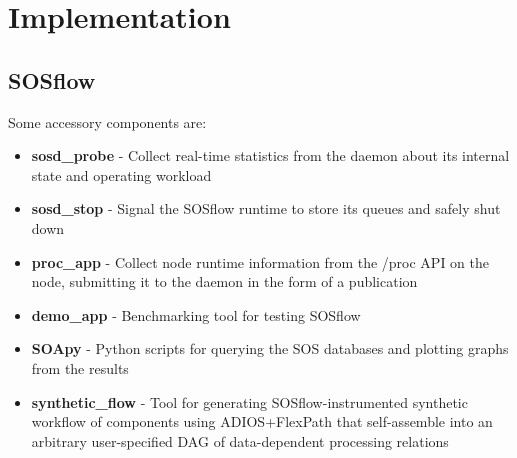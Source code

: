 %
%


%




\section{Implementation}


\subsection{SOSflow}


Some accessory components are:
%
\begin{itemize}
    \item \textbf{sosd\_probe} - Collect real-time statistics from the daemon about
      its internal state and operating workload
    \item \textbf{sosd\_stop} - Signal the SOSflow runtime to store its queues and
      safely shut down
    \item \textbf{proc\_app} - Collect node runtime information from
      the /proc API on the node, submitting it to the daemon in the
      form of a publication
    \item \textbf{demo\_app} - Benchmarking tool for testing SOSflow
    \item \textbf{SOApy} - Python scripts for querying the SOS databases and plotting
      graphs from the results
    \item \textbf{synthetic\_flow} - Tool for generating SOSflow-instrumented
      synthetic workflow of components using ADIOS+FlexPath
      that self-assemble into an arbitrary  user-specified DAG of
      data-dependent processing relations
\end{itemize}

